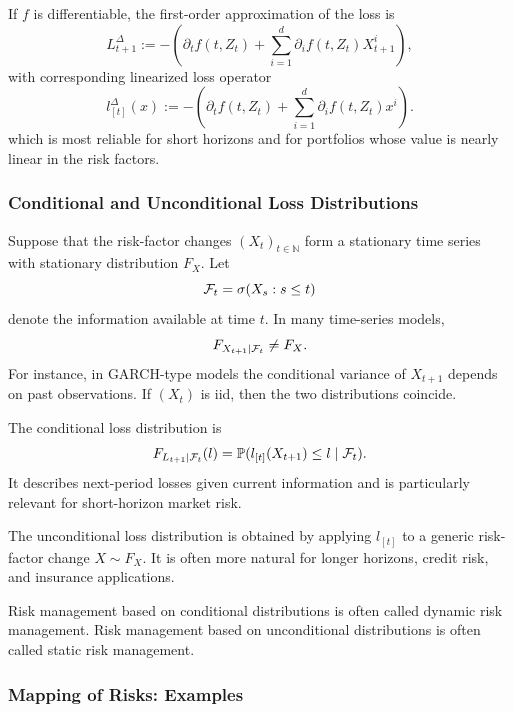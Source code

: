 \begin{proposition}
    
If $f$ is differentiable, the first-order approximation of the loss is
\[
    L_{t+1}^{\Delta}
    :=-\left(\partial_t f(t,Z_t)+\sum_{i=1}^d \partial_i f(t,Z_t)X_{t+1}^i\right),
\]
with corresponding linearized loss operator
\[
    l_{[t]}^{\Delta}(x)
    :=-\left(\partial_t f(t,Z_t)+\sum_{i=1}^d \partial_i f(t,Z_t)x^i\right).
\]
which is most reliable for short horizons and for portfolios whose value is nearly linear in the risk factors.
\end{proposition}


\subsubsection{Conditional and Unconditional Loss Distributions}

Suppose that the risk-factor changes $(X_t)_{t\in\mathbb{N}}$ form a stationary time series with stationary distribution $F_X$. Let
\[
    \mathcal{F}_t=\sigma(X_s:s\le t)
\]
denote the information available at time $t$. In many time-series models,
\[
    F_{X_{t+1}\mid \mathcal{F}_t}\ne F_X.
\]
For instance, in GARCH-type models the conditional variance of $X_{t+1}$ depends on past observations. If $(X_t)$ is iid, then the two distributions coincide.

\begin{definition}
The conditional loss distribution is
\[
    F_{L_{t+1}\mid\mathcal{F}_t}(l)
    =\mathbb{P}(l_{[t]}(X_{t+1})\le l\mid\mathcal{F}_t).
\]
It describes next-period losses given current information and is particularly relevant for short-horizon market risk.
\end{definition}

\begin{definition}
The unconditional loss distribution is obtained by applying $l_{[t]}$ to a generic risk-factor change $X\sim F_X$. It is often more natural for longer horizons, credit risk, and insurance applications.
\end{definition}

Risk management based on conditional distributions is often called dynamic risk management. Risk management based on unconditional distributions is often called static risk management.

\subsubsection{Mapping of Risks: Examples}

